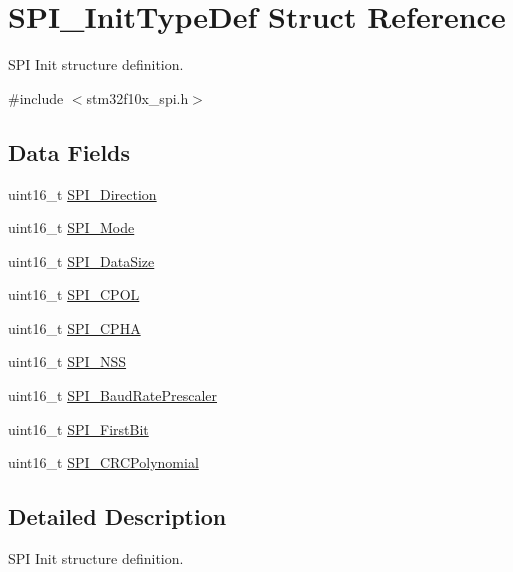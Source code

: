 \hypertarget{struct_s_p_i___init_type_def}{}\section{S\+P\+I\+\_\+\+Init\+Type\+Def Struct Reference}
\label{struct_s_p_i___init_type_def}


S\+PI Init structure definition.  




{\ttfamily \#include $<$stm32f10x\+\_\+spi.\+h$>$}

\subsection*{Data Fields}
\begin{DoxyCompactItemize}
\item 
uint16\+\_\+t \mbox{\hyperlink{struct_s_p_i___init_type_def_a485dbba7798a7ff3d00dfabba19584b8}{S\+P\+I\+\_\+\+Direction}}
\item 
uint16\+\_\+t \mbox{\hyperlink{struct_s_p_i___init_type_def_aeddd33e224d56672843782c105ed82e4}{S\+P\+I\+\_\+\+Mode}}
\item 
uint16\+\_\+t \mbox{\hyperlink{struct_s_p_i___init_type_def_a541e4cbd533e4102ffeffbe8388a38d6}{S\+P\+I\+\_\+\+Data\+Size}}
\item 
uint16\+\_\+t \mbox{\hyperlink{struct_s_p_i___init_type_def_ae8d27aca088402c07e34e5a2ab4902d9}{S\+P\+I\+\_\+\+C\+P\+OL}}
\item 
uint16\+\_\+t \mbox{\hyperlink{struct_s_p_i___init_type_def_a120f808113ce7d69e2ec1ea65abed627}{S\+P\+I\+\_\+\+C\+P\+HA}}
\item 
uint16\+\_\+t \mbox{\hyperlink{struct_s_p_i___init_type_def_a046014c02b6456fd153ea81077e42ab6}{S\+P\+I\+\_\+\+N\+SS}}
\item 
uint16\+\_\+t \mbox{\hyperlink{struct_s_p_i___init_type_def_a35b348a0ba5d3e9a8bc907a7ebe10d13}{S\+P\+I\+\_\+\+Baud\+Rate\+Prescaler}}
\item 
uint16\+\_\+t \mbox{\hyperlink{struct_s_p_i___init_type_def_a5e5761d0b588ff75ad15adb2adf9e7e7}{S\+P\+I\+\_\+\+First\+Bit}}
\item 
uint16\+\_\+t \mbox{\hyperlink{struct_s_p_i___init_type_def_a1f0b3ef1e0062883db3ea3ef5690d0c2}{S\+P\+I\+\_\+\+C\+R\+C\+Polynomial}}
\end{DoxyCompactItemize}


\subsection{Detailed Description}
S\+PI Init structure definition. 



